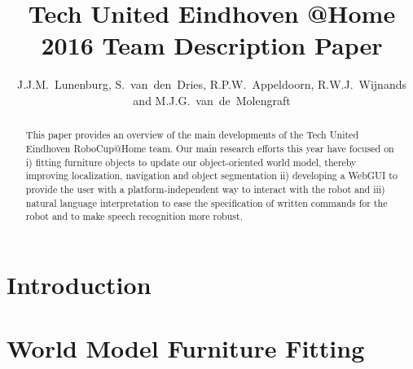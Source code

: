 \documentclass[runningheads,a4paper]{llncs}
\begin{document}
\title{Tech United Eindhoven @Home 2016 Team Description Paper}
\author{J.J.M.~Lunenburg, S.~van~den~Dries, R.P.W.~Appeldoorn, R.W.J.~Wijnands and M.J.G.~van~de~Molengraft}

\maketitle



\begin{abstract}
This paper provides an overview of the main developments of the Tech United Eindhoven RoboCup@Home team. 
Our main research efforts this year have focused on i) fitting furniture objects to update our object-oriented world model, thereby improving localization, navigation and object segmentation ii) developing a WebGUI to provide the user with a platform-independent way to interact with the robot and iii) natural language interpretation to ease the specification of written commands for the robot and to make speech recognition more robust.
\end{abstract}



\section{Introduction}


\section{World Model Furniture Fitting}\label{sec:wmfitting}

\end{document}

